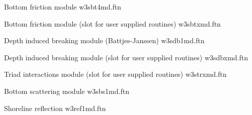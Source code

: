 \noindent
Bottom friction module  \citep[SHOWEX][]{art:Aea03}  \hfill {\file w3sbt4md.ftn}

\begin{flisti}
\end{flisti}

\noindent
Bottom friction module (slot for user supplied routines) \hfill {\file
w3sbtxmd.ftn}

\begin{flisti}
\end{flisti}


\begin{flisti}
\end{flisti}

\noindent
Depth induced breaking module (Battjes-Janssen) \hfill {\file w3sdb1md.ftn}

\begin{flisti}
\end{flisti}

\noindent
Depth induced breaking module (slot for user supplied routines) \hfill {\file
w3sdbxmd.ftn}

\begin{flisti}
\end{flisti}

\noindent
Triad interactions module (slot for user supplied routines) \hfill {\file
w3strxmd.ftn}

\begin{flisti}
\end{flisti}

\noindent
Bottom scattering module \hfill {\file
w3sbs1md.ftn}

\begin{flisti}
\end{flisti}

\noindent
Shoreline reflection \hfill {\file w3ref1md.ftn}

\begin{flisti}
\end{flisti}


